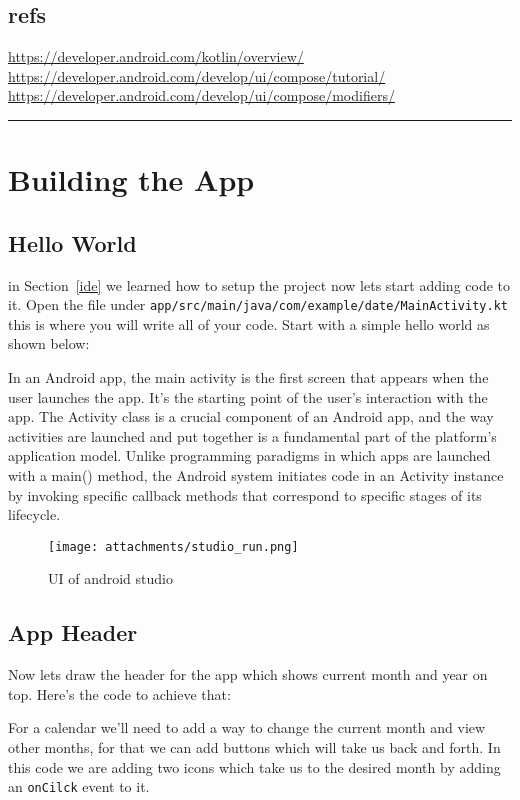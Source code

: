 \documentclass[12pt,oneside]{book}
\begin{document}
\vfill
\section*{refs} 
\url{https://developer.android.com/kotlin/overview/} \\
\url{https://developer.android.com/develop/ui/compose/tutorial/} \\
\url{https://developer.android.com/develop/ui/compose/modifiers/}
\rule{\textwidth}{0.4pt}

\chapter{Building the App}
\section{Hello World}
in Section~\ref{ide} we learned how to setup the project now lets start adding code to it. Open the file under \texttt{app/src/main/java/com/example/date/MainActivity.kt} this is where you will write all of your code. Start with a simple hello world as shown below:

In an Android app, the main activity is the first screen that appears when the user launches the app. It's the starting point of the user's interaction with the app. The Activity class is a crucial component of an Android app, and the way activities are launched and put together is a fundamental part of the platform's application model. Unlike programming paradigms in which apps are launched with a main() method, the Android system initiates code in an Activity instance by invoking specific callback methods that correspond to specific stages of its lifecycle.

\begin{figure}
  \centering
  \texttt{[image: attachments/studio\_run.png]}
  \caption{UI of android studio}
\end{figure}
\newpage

\section{App Header}
Now lets draw the header for the app which shows current month and year on top. Here's the code to achieve that:
\newpage

For a calendar we'll need to add a way to change the current month and view other months, for that we can add buttons which will take us back and forth. In this code we are adding two icons which take us to the desired month by adding an \texttt{onCilck} event to it.
\newpage
\end{document}
